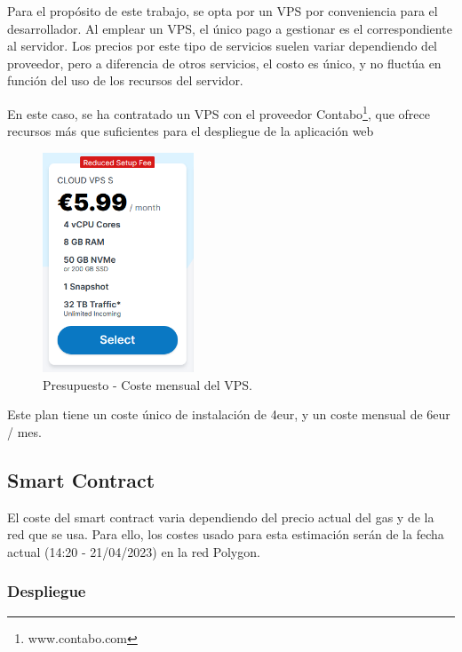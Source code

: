 \bigskip

Para el propósito de este trabajo, se opta por un VPS por conveniencia para el desarrollador. Al emplear un VPS, el único pago a gestionar es el correspondiente al servidor. Los precios por este tipo de servicios suelen variar dependiendo del proveedor, pero a diferencia de otros servicios, el costo es único, y no fluctúa en función del uso de los recursos del servidor.

\bigskip

En este caso, se ha contratado un VPS con el proveedor Contabo\footnote{www.contabo.com}, que ofrece recursos más que suficientes para el despliegue de la aplicación web

\bigskip

\begin{figure}[H]
        \centering
        \includegraphics[width=0.4\textwidth]{img/capturas/vps.png}
        \caption{Presupuesto - Coste mensual del VPS.}
        \label{fig:configApi}
\end{figure}

Este plan tiene un coste único de instalación de 4eur, y un coste mensual de 6eur / mes.

\newpage

\subsection{Smart Contract}

El coste del smart contract varia dependiendo del precio actual del gas y de la red que se usa. Para ello, los costes usado para esta estimación serán de la fecha actual (14:20 - 21/04/2023) en la red Polygon.

\subsubsection{Despliegue}

